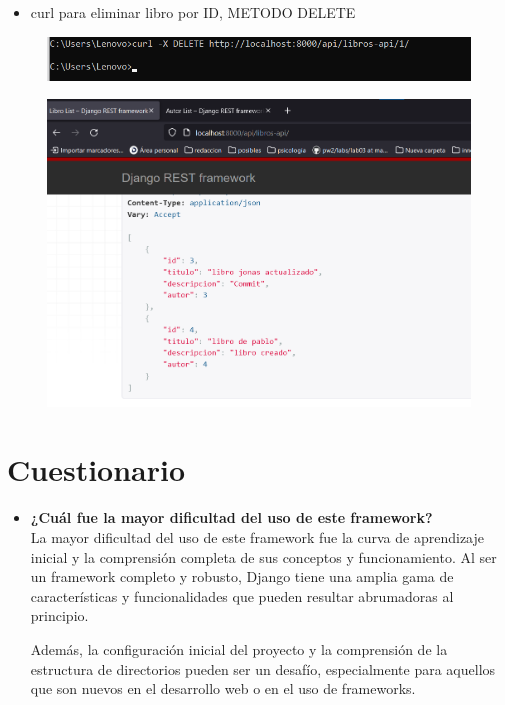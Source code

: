 \documentclass{article}
\begin{document}
	\begin{itemize}
		\item curl para eliminar libro por ID, METODO DELETE
	\end{itemize}
	\begin{figure}[H]
		\centering
		\includegraphics[width=1\textwidth,keepaspectratio]{pruebas/curlEliminarLibro.png}
	\end{figure}
	\begin{figure}[H]
		\centering
		\includegraphics[width=1\textwidth,keepaspectratio]{pruebas/tarea-libro-eliminadoLibro.png}
	\end{figure}
	\section{Cuestionario}
\begin{itemize}
	\item \textbf{¿Cuál fue la mayor dificultad del uso de este framework?} \\
		La mayor dificultad del uso de este framework fue la curva de aprendizaje inicial y la comprensión completa de sus conceptos y funcionamiento. Al ser un framework completo y robusto, Django tiene una amplia gama de características y funcionalidades que pueden resultar abrumadoras al principio.

Además, la configuración inicial del proyecto y la comprensión de la estructura de directorios pueden ser un desafío, especialmente para aquellos que son nuevos en el desarrollo web o en el uso de frameworks.

	
\end{itemize}
	\clearpage
	
\end{document}
